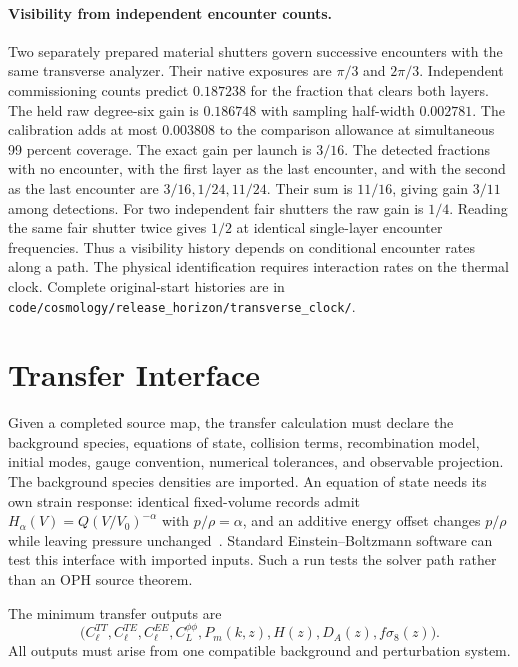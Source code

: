 \documentclass[11pt]{article}
\newcommand{\pathref}[1]{\nolinkurl{#1}}
\theoremstyle{remark}
\begin{document}
\paragraph{Visibility from independent encounter counts.}
Two separately prepared material shutters govern successive encounters
with the same transverse analyzer. Their native exposures are \(\pi/3\)
and \(2\pi/3\). Independent commissioning counts predict
\(0.187238\) for the fraction that clears both layers. The held raw
degree-six gain is \(0.186748\) with sampling half-width \(0.002781\).
The calibration adds at most \(0.003808\) to the comparison allowance
at simultaneous 99 percent coverage. The exact gain per launch is
\(3/16\). The detected fractions with no encounter, with the first
layer as the last encounter, and with the second as the last encounter
are \(3/16,1/24,11/24\). Their sum is \(11/16\), giving gain \(3/11\)
among detections. For two independent fair shutters the raw gain is
\(1/4\). Reading the same fair shutter twice gives \(1/2\) at identical
single-layer encounter frequencies. Thus a visibility history depends
on conditional encounter rates along a path. The physical identification
requires interaction rates on the thermal clock. Complete original-start
histories are in \mbox{\pathref{code/cosmology/release_horizon/transverse_clock/}}.

\section{Transfer Interface}
\label{sec:transfer-interface}

Given a completed source map, the transfer calculation must declare the
background species, equations of state, collision terms, recombination model,
initial modes, gauge convention, numerical tolerances, and observable
projection. The background species densities are imported. An equation of state needs its own strain response:
identical fixed-volume records admit \(H_\alpha(V)=Q(V/V_0)^{-\alpha}\) with
\(p/\rho=\alpha\), and an additive energy offset changes \(p/\rho\) while leaving
pressure unchanged~\cite{ophobservers}.
Standard Einstein--Boltzmann software can test this interface with
imported inputs. Such a run tests the solver path rather than an OPH source
theorem.

The minimum transfer outputs are
\begin{equation}
\bigl(C_\ell^{TT},C_\ell^{TE},C_\ell^{EE},C_L^{\phi\phi},
P_m(k,z),H(z),D_A(z),f\sigma_8(z)\bigr).
\end{equation}
All outputs must arise from one compatible background and perturbation system.
\end{document}

